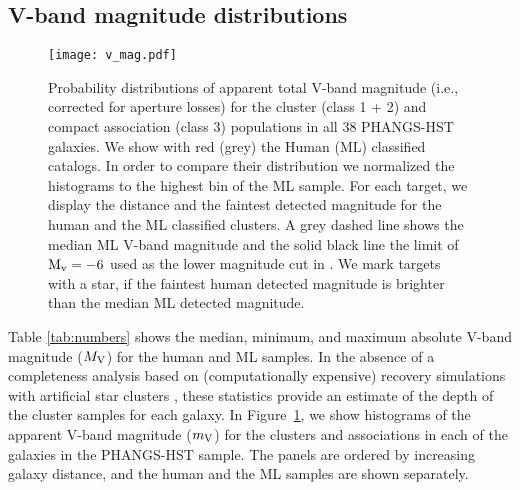 \documentclass[linenumbers]{aastex63}
\begin{document}
\subsection{V-band magnitude distributions}\label{ssect:v_mag}
%
\begin{figure*} 
\texttt{[image: v\_mag.pdf]}
 \caption{Probability distributions of apparent total V-band magnitude (i.e., corrected for aperture losses) for the cluster (class 1 + 2) and compact association (class 3) populations in all  38 PHANGS-HST galaxies. We show with red (grey) the Human (ML) classified catalogs. 
 In order to compare their distribution we normalized the histograms to the highest bin of the ML sample.
 For each target, we display the distance and the faintest detected magnitude for the human and the ML classified clusters. A grey dashed line shows the median ML V-band magnitude and the solid black line the limit of ${\rm M_v=-6}$ used as the lower magnitude cut in \citet{adamo_legacy_2017}. We mark targets with a star, if the faintest human detected magnitude is brighter than the median ML detected magnitude.}
 \label{fig:v_mag_panel}
\end{figure*}
%
Table \ref{tab:numbers} shows the median, minimum, and maximum absolute V-band
magnitude ($M_{\rm V}$) for the human and ML samples.  In the absence of a completeness analysis based on (computationally expensive) recovery simulations with artificial star clusters \citep[e.g.][]{mayya08, adamo_legacy_2017, messa_young_2018, linden_massive_2021, linden_star_2022, tang_cluster_2023}, these statistics provide an estimate of the depth of the cluster samples for each galaxy. In Figure~\ref{fig:v_mag_panel}, we show histograms of the apparent V-band magnitude ($m_{\rm V}$) for the clusters and associations in each of the galaxies in the PHANGS-HST sample. The panels are ordered by increasing galaxy distance, and the human and the ML samples are shown separately.
\end{document}
